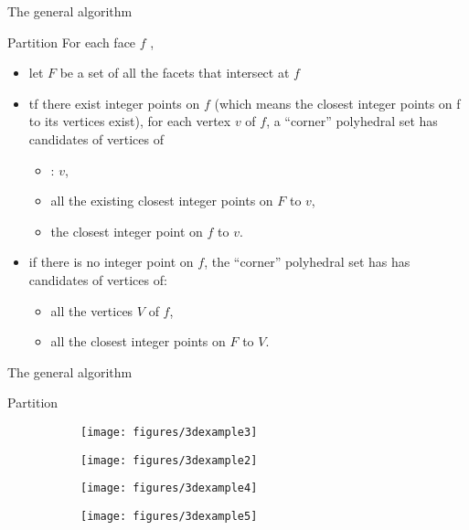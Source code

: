 \begin{frame}{The general algorithm}
	\begin{block}{Partition}
		For each face $f$ , 
		\begin{itemize}
			\item let $F$ be a set of all the facets that intersect at $f$
			\item tf there exist integer points on $f$ (which
			means the closest integer points on f to its vertices exist), for each vertex $v$ of $f$, a ``corner'' polyhedral set has candidates of vertices of
			\begin{itemize}
				\item : $v$, 
				\item all the existing closest integer points on $F$
				to $v$,
				\item the closest integer point on $f$ to $v$.
			\end{itemize}
			\item if there is no integer point on $f$, the ``corner''
			polyhedral set has has candidates of vertices of: 
			\begin{itemize}
				\item all the vertices $V$ of $f$,
				\item all the closest integer points on $F$ to $V$.
			\end{itemize}
		\end{itemize}
	\end{block}
\end{frame}

\begin{frame}{The general algorithm}
	\begin{block}{Partition}
		\begin{figure}[htbp]
			\begin{subfigure}[t]{0.3\textwidth}
				\texttt{[image: figures/3dexample3]}
			\end{subfigure}\hspace{.6in}
			\begin{subfigure}[t]{0.3\textwidth}
				\texttt{[image: figures/3dexample2]}
			\end{subfigure}
			
			\begin{subfigure}[t]{0.3\textwidth}
				\texttt{[image: figures/3dexample4]}
			\end{subfigure}\hspace{.6in}
			\begin{subfigure}[t]{0.3\textwidth}
				\texttt{[image: figures/3dexample5]}
			\end{subfigure}
			\label{figure}
		\end{figure}
	\end{block}
\end{frame}

